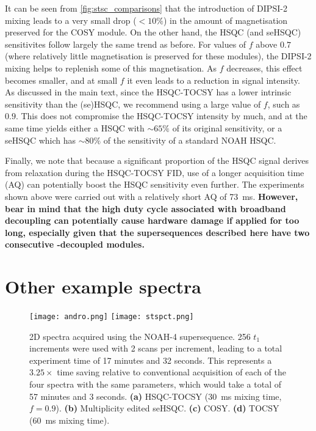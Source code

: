 It can be seen from \cref{fig:stsc_comparisons} that the introduction of DIPSI-2 mixing leads to a very small drop ($< 10\%$) in the amount of  magnetisation preserved for the COSY module.
On the other hand, the HSQC (and seHSQC) sensitivites follow largely the same trend as before.
For values of $f$ above $0.7$ (where relatively little  magnetisation is preserved for these modules), the DIPSI-2 mixing helps to replenish some of this magnetisation.
As $f$ decreases, this effect becomes smaller, and at small $f$ it even leads to a reduction in signal intensity.
As discussed in the main text, since the HSQC-TOCSY has a lower intrinsic sensitivity than the (se)HSQC, we recommend using a large value of $f$, such as $0.9$.
This does not compromise the HSQC-TOCSY intensity by much, and at the same time yields either a HSQC with $\sim 65\%$ of its original sensitivity, or a seHSQC which has $\sim 80\%$ of the sensitivity of a standard NOAH HSQC.

Finally, we note that because a significant proportion of the HSQC signal derives from  relaxation during the HSQC-TOCSY FID, use of a longer acquisition time (AQ) can potentially boost the HSQC sensitivity even further.
The experiments shown above were carried out with a relatively short AQ of \SI{73}{\ms}.
\textbf{However, bear in mind that the high duty cycle associated with broadband  decoupling can potentially cause hardware damage if applied for too long, especially given that the supersequences described here have two consecutive -decoupled modules.}

\section{Other example spectra}
\label{section:si_spectra}

\begin{figure}
    \centering
    \texttt{[image: andro.png]}\phantom{aaaaaa}
    \texttt{[image: stspct.png]}
    \caption{
        2D spectra acquired using the NOAH-4  supersequence.
        256 $t_1$ increments were used with 2 scans per increment, leading to a total experiment time of 17 minutes and 32 seconds.
        This represents a $3.25\times$ time saving relative to conventional acquisition of each of the four spectra with the same parameters, which would take a total of 57 minutes and 3 seconds.
        \textbf{(a)} HSQC-TOCSY (\SI{30}{ms} mixing time, $f = 0.9$).
        \textbf{(b)} Multiplicity edited seHSQC.
        \textbf{(c)} COSY.
        \textbf{(d)} TOCSY (\SI{60}{ms} mixing time).
        \andro{}
    }
    \label{fig:stspct}
\end{figure}

